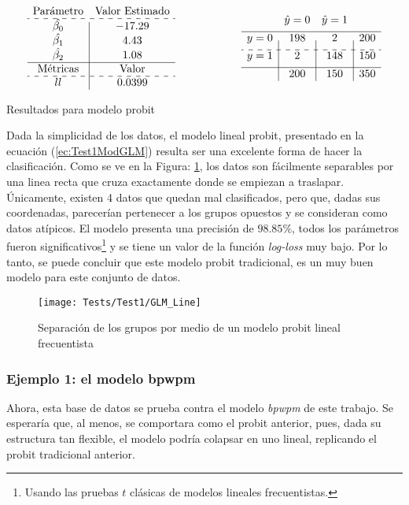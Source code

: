 \documentclass[../Main/Main.tex]{subfiles}
\begin{document}
\begin{table}[h]
\begin{align*}
\begin{array}{c|c}
\text{Parámetro} &\text{Valor Estimado} \\
\hdashline
\hat{\beta_0} & -17.29 \\
\hat{\beta_1} & 4.43 \\
\hat{\beta_2} & 1.08 \\
\hline
\text{Métricas} & \text{Valor} \\
\hdashline
ll & 0.0399
\end{array}
\qquad\qquad\qquad
\matconf{198}{2}{200}{2}{148}{150}{200}{150}{350}
\end{align*}
\caption{Resultados para modelo probit}
\label{tab:Test0}
\end{table}

Dada la simplicidad de los datos, el modelo lineal probit, presentado en la ecuación (\ref{ec:Test1ModGLM}) resulta ser una excelente forma de hacer la clasificación. Como se ve en la Figura: \ref{fig:Test0ModGLM}, los datos son fácilmente separables por una linea recta que cruza exactamente donde se empiezan a traslapar. Únicamente, existen 4 datos que quedan mal clasificados, pero que, dadas sus coordenadas, parecerían pertenecer a los grupos opuestos y se consideran como datos atípicos. El modelo presenta una precisión de $98.85\%$, todos los parámetros fueron significativos\footnote{Usando las pruebas $t$ clásicas de modelos lineales frecuentistas.} y se tiene un valor de la función \textit{log-loss} muy bajo. Por lo tanto, se puede concluir que este modelo probit tradicional, es un muy buen modelo para este conjunto de datos. 
\begin{figure}[h]
  \centering
      \texttt{[image: Tests/Test1/GLM\_Line]}
  \caption{Separación de los grupos por medio de un modelo probit lineal frecuentista}
 \label{fig:Test0ModGLM}
\end{figure}

\subsubsection*{Ejemplo 1: el modelo bpwpm} \label{sec:Test1Ej1}
Ahora, esta base de datos se prueba contra el modelo \textit{bpwpm} de este trabajo. Se esperaría que, al menos, se comportara como el probit anterior, pues, dada su estructura tan flexible, el modelo podría colapsar en uno lineal, replicando el probit tradicional anterior. 
\end{document}

